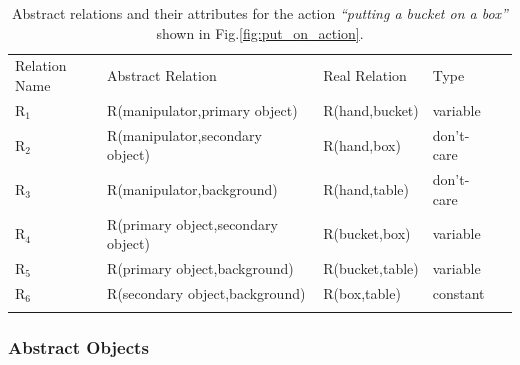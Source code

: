 \begin{table}[!hb]
\centering
\caption{Abstract relations and their attributes for the action {\it ``putting a bucket on a box''} shown in Fig.\ref{fig:put_on_action}.}
\begin{tabular}{ lllll }
\hline\noalign{\smallskip}
Relation Name & Abstract Relation & Real Relation & Type \\
\noalign{\smallskip}\hline\noalign{\smallskip}
$\text{R}_1$  & R(manipulator,primary object) & R(hand,bucket) & variable \\
$\text{R}_2$  & R(manipulator,secondary object)& R(hand,box) & don't-care \\
$\text{R}_3$  & R(manipulator,background) & R(hand,table) & don't-care \\
$\text{R}_4$  & R(primary object,secondary object) & R(bucket,box) & variable  \\
$\text{R}_5$  & R(primary object,background) & R(bucket,table) & variable \\
$\text{R}_6$  & R(secondary object,background)& R(box,table) & constant \\
\noalign{\smallskip}\hline
\end{tabular}
\label{tab:relations}
\end{table}



\subsubsection{Abstract Objects}
\label{sec:abstractobjects}

